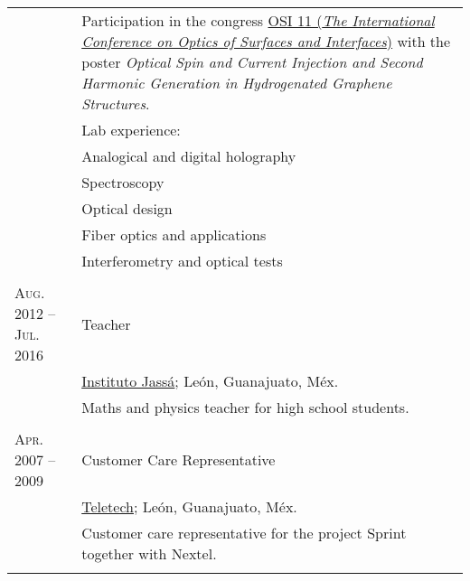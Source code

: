 \documentclass[letterpaper,10pt]{article}
\begin{document}
\begin{tabular}{R{4cm}|p{11cm}}
                        &   \footnotesize{Participation in the congress \href{http://www.osiconference.org/osi2015/index.php}{OSI 11 (\emph{The International Conference on Optics of Surfaces and Interfaces})} with the poster \emph{Optical Spin and Current Injection and Second Harmonic Generation in Hydrogenated Graphene Structures}.}\\
                        &   \footnotesize{Lab experience:}\\
                        &   \footnotesize{\qquad Analogical and digital holography}\\
                        &   \footnotesize{\qquad Spectroscopy}\\
                        &   \footnotesize{\qquad Optical design}\\
                        &   \footnotesize{\qquad Fiber optics and applications}\\
                        &   \footnotesize{\qquad Interferometry and optical tests}\\
                         \\
\textsc{Aug. 2012 -- Jul. 2016 }    &   Teacher \\
                        &   \href{http://www.institutojassa.edu.mx/}{Instituto Jass\'a}; Le\'on, Guanajuato, M\'ex.\\
                        &   \footnotesize{Maths and physics teacher for high school students. }\\
                         \\
\textsc{Apr. 2007 -- 2009}  &   Customer Care Representative\\
                        &   \href{http://www.teletech.com/worldwide/spanish}{Teletech}; Le\'on, Guanajuato, M\'ex.\\
                        &   \footnotesize{Customer care representative for the project Sprint together with Nextel.}\\
                             \\
\end{tabular}

\newpage
\end{document}
